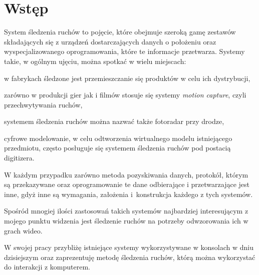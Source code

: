 \chapter{Wstęp}\label{ch:introduction}

System śledzenia ruchów to pojęcie, które obejmuje szeroką gamę zestawów składających się z urządzeń dostarczających danych o położeniu oraz wyspecjalizowanego oprogramowania, które te informacje przetwarza.
Systemy takie, w ogólnym ujęciu, można spotkać w wielu miejscach:
\begin{aenumerate}
  \item w fabrykach śledzone jest przemieszczanie się produktów w celu ich dystrybucji,
  \item zarówno w produkcji gier jak i filmów stosuje się systemy \textsl{motion capture}, czyli przechwytywania ruchów,
  \item systemem śledzenia ruchów można nazwać także fotoradar przy drodze,
  \item cyfrowe modelowanie, w celu odtworzenia wirtualnego modelu istniejącego przedmiotu, często posługuje się systemem śledzenia ruchów pod postacią digitizera.
\end{aenumerate}

W każdym przypadku zarówno metoda pozyskiwania danych, protokół, którym są przekazywane oraz oprogramowanie te dane odbierające i przetwarzające jest inne, gdyż inne są wymagania, założenia i~konstrukcja każdego z tych systemów.

Spośród mnogiej ilości zastosowań takich systemów najbardziej interesującym z mojego punktu widzenia jest śledzenie ruchów na potrzeby odwzorowania ich w grach wideo.

W swojej pracy przybliżę istniejące systemy wykorzystywane w konsolach w dniu dzisiejszym oraz zaprezentuję metodę śledzenia ruchów, którą można wykorzystać do interakcji z komputerem.
